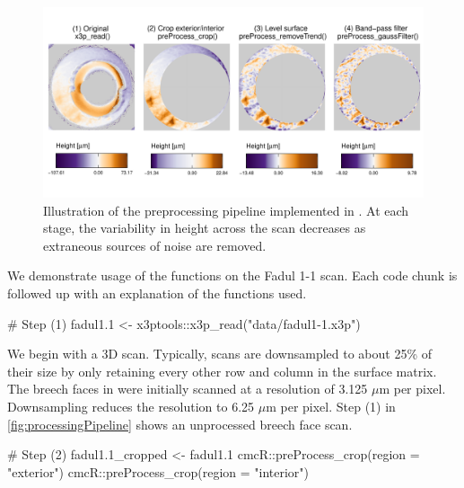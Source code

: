 \begin{Schunk}
\begin{figure}[htbp]

{\centering \includegraphics[width=\textwidth]{figures/cmcr-unnamed-chunk-5-1} 

}

\caption{\label{fig:processingPipeline} Illustration of the  preprocessing pipeline implemented in .  At each stage, the variability in height across the scan decreases as extraneous sources of noise are removed.}\label{fig:unnamed-chunk-5}
\end{figure}
\end{Schunk}

We demonstrate usage of the  functions on the Fadul
1-1 scan. Each code chunk is followed up with an explanation of the
functions used.

\begin{Schunk}
\begin{Sinput}
# Step (1)
fadul1.1 <- x3ptools::x3p_read("data/fadul1-1.x3p")
\end{Sinput}
\end{Schunk}

We begin with a 3D scan. Typically, scans are downsampled to about 25\%
of their size by only retaining every other row and column in the
surface matrix. The breech faces in \citet{fadul_empirical_2011} were
initially scanned at a resolution of 3.125 \(\mu\)m per pixel.
Downsampling reduces the resolution to 6.25 \(\mu\)m per pixel. Step (1)
in \autoref{fig:processingPipeline} shows an unprocessed breech face
scan.

\begin{Schunk}
\begin{Sinput}
# Step (2)
fadul1.1_cropped <- fadul1.1 %
  cmcR::preProcess_crop(region = "exterior") %
  cmcR::preProcess_crop(region = "interior")
\end{Sinput}
\end{Schunk}


